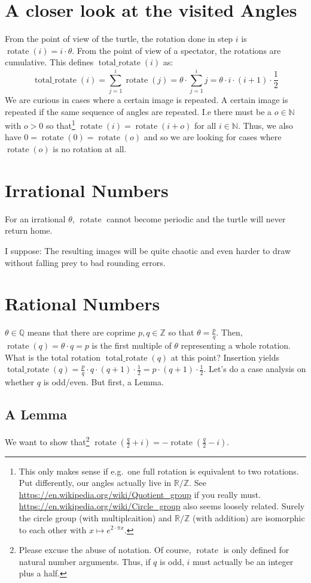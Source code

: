\documentclass[pdftex,a4paper]{scrartcl}
\DeclareMathOperator{\rotate}{rotate}
\DeclareMathOperator{\total}{total\_rotate}
\begin{document}
\section{A closer look at the visited Angles}
From the point of view of the turtle, the rotation done in step \(i\) is \(\rotate(i)=i\cdot\theta\). From the point of
view of a spectator, the rotations are cumulative. This defines \(\total(i)\) as:
\[
\total(i)=\sum_{j=1}^i \rotate(j) = \theta\cdot\sum_{j=1}^i j = \theta\cdot i\cdot(i+1)\cdot\frac{1}{2}
\]
We are curious in cases where a certain image is repeated. A certain image is repeated if the same sequence of angles
are repeated.
I.e there must be a \(o\in\mathbb{N}\) with \(o>0\) so that\footnote{This only makes sense if e.g.\ one full rotation is
equivalent to two rotations. Put differently, our angles actually live in \(\mathbb{R}/\mathbb{Z}\). See
\url{https://en.wikipedia.org/wiki/Quotient_group} if you really must. \url{https://en.wikipedia.org/wiki/Circle_group}
also seems loosely related. Surely the circle group (with multiplcaition) and \(\mathbb{R}/\mathbb{Z}\) (with addition)
are isomorphic to each other with \(x\mapsto e^{2\cdot\pi x}\).} \(\rotate(i)=\rotate(i+o)\) for all \(i\in\mathbb{N}\). Thus, we also have
\(0=\rotate(0)=\rotate(o)\) and so we are looking for cases where \(\rotate(o)\) is no rotation at all.

\section{Irrational Numbers}
For an irrational \(\theta\), \(\rotate\) cannot become periodic and the turtle will never return home.

I suppose: The resulting images will be quite chaotic and even harder to draw without falling prey to bad rounding
errors.

\section{Rational Numbers}
\(\theta\in\mathbb{Q}\) means that there are coprime \(p,q\in\mathbb{Z}\) so that \(\theta=\frac{p}{q}\). Then,
\(\rotate(q)=\theta\cdot q=p\) is the first multiple of \(\theta\) representing a whole rotation. What is the total
rotation \(\total(q)\) at this point? Insertion yields \(\total(q)=\frac{p}{q}\cdot q\cdot(q+1)\cdot \frac{1}{2}
=p\cdot(q+1)\cdot\frac{1}{2}\).
Let's do a case analysis on whether \(q\) is odd/even. But first, a Lemma.

\subsection{A Lemma}
We want to show that\footnote{Please excuse the abuse of notation. Of course, \(\rotate\) is only defined for natural
number arguments. Thus, if \(q\) is odd, \(i\) must actually be an integer plus a half.}
\(\rotate(\frac{q}{2}+i)=-\rotate(\frac{q}{2}-i)\).
\end{document}
